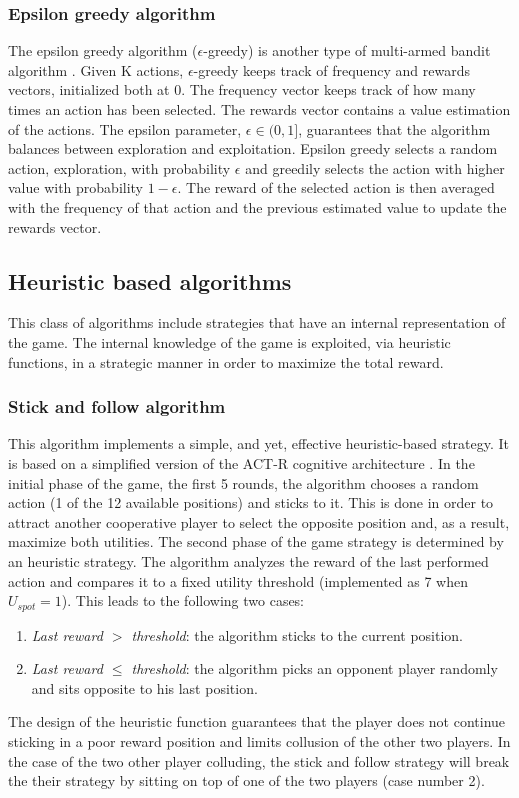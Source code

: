 \documentclass[runningheads]{llncs}
\begin{document}
\subsubsection{Epsilon greedy algorithm}
The epsilon greedy algorithm ($\epsilon$-greedy) is another type of
multi-armed bandit algorithm \cite{egreedy}. Given K actions, $\epsilon$-greedy keeps
track of frequency and rewards vectors, initialized both at 0. The
frequency vector keeps track of how many times an action has been
selected. The rewards vector contains a value estimation of the
actions. The epsilon parameter, $\epsilon \in (0, 1]$, guarantees that
the algorithm balances between exploration and exploitation. Epsilon
greedy selects a random action, exploration, with probability
$\epsilon$ and greedily selects the action with higher value with
probability $1 - \epsilon$. The reward of the selected action is then
averaged with the frequency of that action and the previous estimated
value to update the rewards vector.


\subsection{Heuristic based algorithms}
This class of algorithms include strategies that have an internal
representation of the game. The internal knowledge of the game is
exploited, via heuristic functions, in a strategic manner in order to
maximize the total reward.

\subsubsection{Stick and follow algorithm}
This algorithm implements a simple, and yet, effective heuristic-based
strategy. It is based on a simplified version of the ACT-R cognitive
architecture \cite{act-r}. In the initial phase of the game, the first 5
rounds, the algorithm chooses a random action (1 of the 12 available
positions) and sticks to it. This is done in order to attract another
cooperative player to select the opposite position and, as a result,
maximize both utilities. The second phase of the game strategy is
determined by an heuristic strategy. The algorithm analyzes the reward
of the last performed action and compares it to a fixed utility
threshold (implemented as 7 when $U_{spot} = 1$). This leads to the
following two cases:
\begin{enumerate}
\item \textit{Last reward $>$ threshold}: the algorithm sticks to the
  current position.
\item \textit{Last reward $\leq$ threshold}: the algorithm picks an
  opponent player randomly and sits opposite to his last position.
\end{enumerate}
The design of the heuristic function guarantees that the player does
not continue sticking in a poor reward position and limits collusion
of the other two players. In the case of the two other player
colluding, the stick and follow strategy will break the their strategy
by sitting on top of one of the two players (case number 2). 
\end{document}
